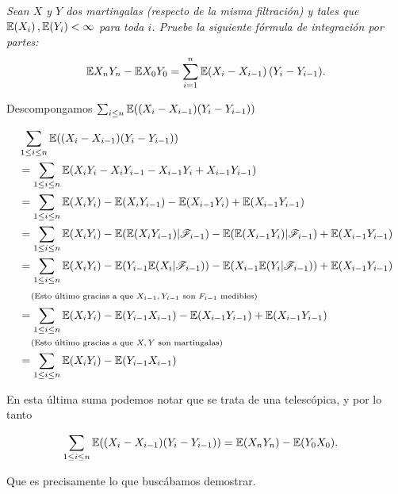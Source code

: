\emph{
    Sean $X$ y $Y$ dos martingalas (respecto de la misma filtraci\'on) y tales que $\mathbb{E}\! \left( X_i \right),\mathbb{E}\! \left( Y_i \right)<\infty$ 
    para toda $i$. Pruebe la siguiente f\'ormula de integraci\'on por partes: 
    \begin{align}
        \mathbb{E}{X_nY_n}-\mathbb{E}{X_0 Y_0}=\sum_{i=1}^n \mathbb{E}{\left( X_i-X_{i-1}\right) \left( Y_i-Y_{i-1}\right) }. 
    \end{align}
}

\afterstatement\pn

Descompongamos $\sum_{i \leq n} \mathbb{E}((X_i - X_{i-1}) (Y_i - Y_{i-1}))$

\begin{align}
    &\sum_{1 \leq i \leq n} \mathbb{E}((X_i - X_{i-1}) (Y_i - Y_{i-1}))                                                                         \\
    &=  \sum_{1 \leq i \leq n} \mathbb{E}(X_i Y_i - X_i Y_{i-1} - X_{i-1} Y_i + X_{i-1} Y_{i-1})                                                \\
    &=  \sum_{1 \leq i \leq n} \mathbb{E}(X_i Y_i) - \mathbb{E}(X_i Y_{i-1}) - \mathbb{E}(X_{i-1} Y_i) + \mathbb{E}(X_{i-1} Y_{i-1})                                    \\
    &=  \sum_{1 \leq i \leq n} \mathbb{E}(X_i Y_i) - \mathbb{E}(\mathbb{E}(X_i Y_{i-1}) | \mathscr{F}_{i-1}) - \mathbb{E}(\mathbb{E}(X_{i-1} Y_i) | \mathscr{F}_{i-1}) + \mathbb{E}(X_{i-1} Y_{i-1})      \\
    &=  \sum_{1 \leq i \leq n} \mathbb{E}(X_i Y_i) - \mathbb{E}(Y_{i-1} \mathbb{E}(X_i | \mathscr{F}_{i-1})) - \mathbb{E}(X_{i-1}\mathbb{E}(Y_i | \mathscr{F}_{i-1})) + \mathbb{E}(X_{i-1} Y_{i-1})       \\
    &\;\;\;\;\mbox{{\scriptsize(Esto último gracias a que $X_{i-1}, Y_{i-1}$ son $F_{i-1}$ medibles)}}                                                      \\
    &=  \sum_{1 \leq i \leq n} \mathbb{E}(X_i Y_i) - \mathbb{E}(Y_{i-1} X_{i-1}) - \mathbb{E}(X_{i-1} Y_{i-1}) + \mathbb{E}(X_{i-1} Y_{i-1})                            \\
    &\;\;\;\;\mbox{{\scriptsize(Esto último gracias a que $X,Y$ son martingalas)}}                                                                          \\
    &=  \sum_{1 \leq i \leq n} \mathbb{E}(X_i Y_i) - \mathbb{E}(Y_{i-1} X_{i-1})                                                                        
\end{align}\pn

En esta última suma podemos notar que se trata de una telescópica, y por lo tanto

\begin{align}
    \sum_{1 \leq i \leq n} \mathbb{E}((X_i - X_{i-1}) (Y_i - Y_{i-1})) &=  \mathbb{E}(X_n Y_n) - \mathbb{E}(Y_{0} X_{0}).
\end{align}\pn

Que es precisamente lo que buscábamos demostrar.